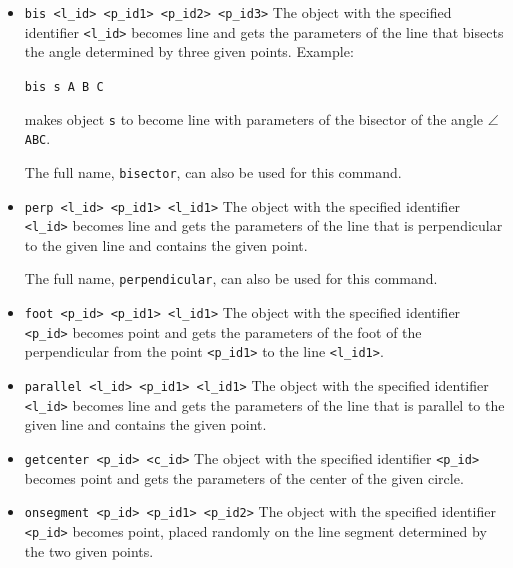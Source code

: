 \documentclass[a4paper]{book}
\begin{document}
\begin{itemize}
\item \verb|bis <l_id> <p_id1> <p_id2> <p_id3>|
        The object with the specified identifier \verb|<l_id>| becomes
        {\sc line} and gets the parameters of the line that bisects the
        angle determined by three given points.
        Example:

        \verb|bis s A B C|

        makes object \verb|s| to become {\sc line} with parameters of the
        bisector of the angle $\angle$\verb|ABC|.

        The full name, \verb|bisector|, can also be used for this command.

\item \verb|perp <l_id> <p_id1> <l_id1>|
        The object with the specified identifier \verb|<l_id>| becomes {\sc line} and
        gets the parameters of the line that is perpendicular to the given line
        and contains the given point.

        The full name, \verb|perpendicular|, can also be used for this command.

\item \verb|foot <p_id> <p_id1> <l_id1>|
        The object with the specified identifier \verb|<p_id>| becomes {\sc point}
        and gets the parameters of the foot of the perpendicular from the point
        \verb|<p_id1>| to the line \verb|<l_id1>|.

\item \verb|parallel <l_id> <p_id1> <l_id1>|
        The object with the specified identifier \verb|<l_id>| becomes
        {\sc line} and gets the parameters of the line that is parallel to
        the given line and contains the given point.

\item \verb|getcenter <p_id> <c_id>|
        The object with the specified identifier \verb|<p_id>| becomes
        {\sc point} and gets the parameters of the center of the given circle.

\item \verb|onsegment <p_id> <p_id1> <p_id2>|
        The object with the specified identifier \verb|<p_id>| becomes {\sc point},
        placed randomly on the line segment determined by the two given points.


\end{itemize}
\end{document}
